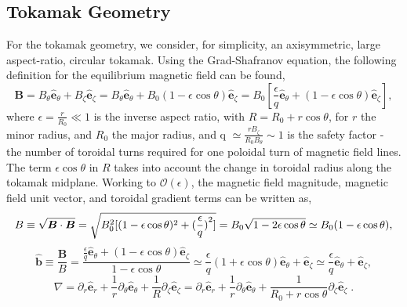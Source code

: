 \documentclass[12pt]{article}
\numberwithin{equation}{subsection}
\begin{document}
\subsection{Tokamak Geometry}
   \quad For the tokamak geometry, we consider, for simplicity, an axisymmetric, large aspect-ratio, circular tokamak.
Using the Grad-Shafranov equation, the following definition for the equilibrium magnetic field can be found,
   \begin{equation}
      \bm{B} = B_\theta\bm{\hat{e}}_\theta + B_\zeta\bm{\hat{e}}_\zeta =
               B_\theta\bm{\hat{e}}_\theta + B_0(1-\epsilon\cos\theta)\bm{\hat{e}}_\zeta =
               B_0[\frac{\epsilon}{q}\bm{\hat{e}}_\theta + (1-\epsilon\cos\theta)\bm{\hat{e}}_\zeta],
   \end{equation}
where $\epsilon=\frac{r}{R_0} \ll 1$ is the inverse aspect ratio, with $R=R_0+r\cos\theta$, for $r$ the minor radius,
and $R_0$ the major radius, and q $\simeq\frac{rB_\zeta}{R_0B_\theta}\sim1$ is the safety factor - the number of
toroidal turns required for one poloidal turn of magnetic field lines. The term $\epsilon\cos\theta$ in $R$ takes into
account the change in toroidal radius along the tokamak midplane. Working to $\mathcal{O}(\epsilon)$, the magnetic field
magnitude, magnetic field unit vector, and toroidal gradient terms can be written as,
   \begin{equation}
      B \equiv \sqrt{\bm{B}\cdot\bm{B}} = \sqrt{B_0^2[(1-\epsilon\cos\theta)^2 + (\frac{\epsilon}{q})\strut^2]} =
          B_0\sqrt{1-2\epsilon\cos\theta} \simeq B_0(1-\epsilon\cos\theta),
   \end{equation}
   \begin{equation}
      \bm{\hat{b}} \equiv \frac{\bm{B}}{B} = \frac{\frac{\epsilon}{q}\bm{\hat{e}}_\theta + (1-\epsilon\cos\theta)\bm{\hat{e}}_\zeta}
                     {1-\epsilon\cos\theta} \simeq \frac{\epsilon}{q}(1+\epsilon\cos\theta)\bm{\hat{e}}_\theta + 
                     \bm{\hat{e}}_\zeta \simeq \frac{\epsilon}{q}\bm{\hat{e}}_\theta + \bm{\hat{e}}_\zeta,
   \end{equation}
   \begin{equation}
      \nabla = \partial_r\bm{\hat{e}}_r + \frac{1}{r}\partial_\theta\bm{\hat{e}}_\theta +
               \frac{1}{R}\partial_\zeta\bm{\hat{e}}_\zeta = \partial_r\bm{\hat{e}}_r   +
               \frac{1}{r}\partial_\theta\bm{\hat{e}}_\theta + \frac{1}{R_0 + r\cos\theta}\partial_\zeta\bm{\hat{e}}_\zeta\;.
   \end{equation}
\end{document}
